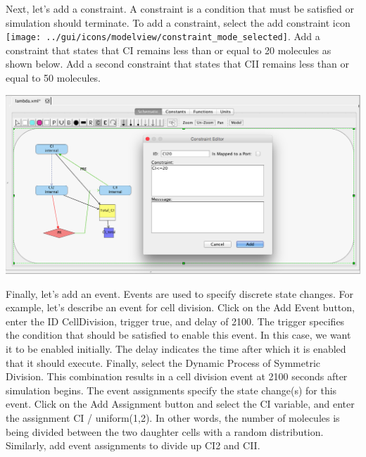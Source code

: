 \documentclass[titlepage,11pt]{article}
\begin{document}


Next, let's add a constraint.  A constraint is a condition that must be satisfied or simulation should terminate.  To add a constraint, select the add constraint icon
\texttt{[image: ../gui/icons/modelview/constraint\_mode\_selected]}.  Add a constraint that states that CI remains less than or equal to 20 molecules as shown below.  Add a second constraint that states that CII remains less than or equal to 50 molecules.

\begin{center}
\includegraphics[width=160mm]{screenshots/constraint}
\end{center}

Finally, let's add an event.  Events are used to specify discrete state changes.  For example, let's describe an event for cell division.  Click on the Add Event button, enter the ID CellDivision, trigger true, and delay of 2100.  The trigger specifies the condition that should be satisfied to enable this event.  In this case, we want it to be enabled initially.  The delay indicates the time after which it is enabled that it should execute.  Finally, select the Dynamic Process of Symmetric Division.  This combination results in a cell division event at 2100 seconds after simulation begins.  The event assignments specify the state change(s) for this event.  Click on the Add Assignment button and select the CI variable, and enter the assignment CI / uniform(1,2).  In other words, the number of molecules is being divided between the two daughter cells with a random distribution.  Similarly, add event assignments to divide up CI2 and CII.
\end{document}
